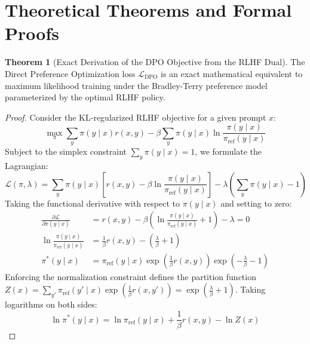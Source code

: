 \documentclass[11pt,a4paper]{article}
\theoremstyle{definition}
\newtheorem{theorem}{\textbf{Theorem}}[section]
\begin{document}
\section{Theoretical Theorems and Formal Proofs}

\begin{theorem}[Exact Derivation of the DPO Objective from the RLHF Dual]
The Direct Preference Optimization loss $\mathcal{L}_{\text{DPO}}$ is an exact mathematical equivalent to maximum likelihood training under the Bradley-Terry preference model parameterized by the optimal RLHF policy.
\end{theorem}

\begin{proof}
Consider the KL-regularized RLHF objective for a given prompt $x$:
{\boldmath
\begin{equation}
\max_\pi \sum_y \pi(y \mid x) r(x, y) - \beta \sum_y \pi(y \mid x) \ln \frac{\pi(y \mid x)}{\pi_{\text{ref}}(y \mid x)}
\end{equation}
}
Subject to the simplex constraint $\sum_y \pi(y \mid x) = 1$, we formulate the Lagrangian:
{\boldmath
\begin{equation}
\mathcal{L}(\pi, \lambda) = \sum_y \pi(y \mid x) \left[ r(x, y) - \beta \ln \frac{\pi(y \mid x)}{\pi_{\text{ref}}(y \mid x)} \right] - \lambda \left( \sum_y \pi(y \mid x) - 1 \right)
\end{equation}
}
Taking the functional derivative with respect to $\pi(y \mid x)$ and setting to zero:
{\boldmath
\begin{align}
\frac{\partial \mathcal{L}}{\partial \pi(y \mid x)} &= r(x, y) - \beta \left( \ln \frac{\pi(y \mid x)}{\pi_{\text{ref}}(y \mid x)} + 1 \right) - \lambda = 0 \\
\ln \frac{\pi(y \mid x)}{\pi_{\text{ref}}(y \mid x)} &= \frac{1}{\beta} r(x, y) - \left( \frac{\lambda}{\beta} + 1 \right) \\
\pi^*(y \mid x) &= \pi_{\text{ref}}(y \mid x) \exp\left( \frac{1}{\beta} r(x, y) \right) \exp\left( -\frac{\lambda}{\beta} - 1 \right)
\end{align}
}
Enforcing the normalization constraint defines the partition function $Z(x) = \sum_{y'} \pi_{\text{ref}}(y' \mid x) \exp\left(\frac{1}{\beta} r(x, y')\right) = \exp\left(\frac{\lambda}{\beta} + 1\right)$.
Taking logarithms on both sides:
{\boldmath
\begin{equation}
\ln \pi^*(y \mid x) = \ln \pi_{\text{ref}}(y \mid x) + \frac{1}{\beta} r(x, y) - \ln Z(x)
\end{equation}
}

\end{proof}
\end{document}
